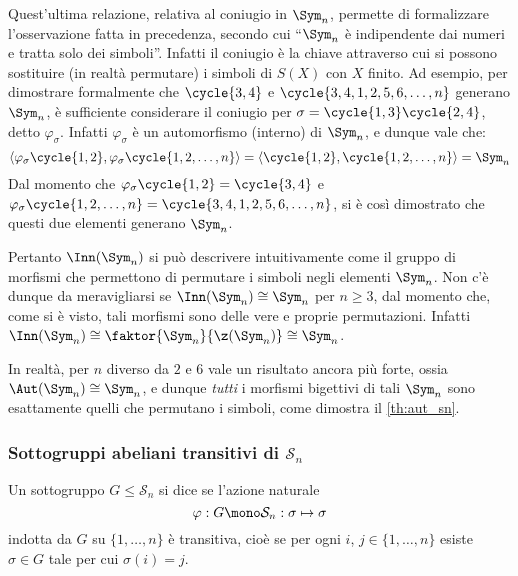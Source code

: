 \documentclass[11pt]{scrartcl}
\begin{document}
	\begin{remark}
		Quest'ultima relazione, relativa al coniugio in $\Sym_n$, permette di
		formalizzare l'osservazione fatta in precedenza, secondo cui
		``$\Sym_n$ è indipendente dai numeri e tratta solo dei simboli''. Infatti
		il coniugio è la chiave attraverso cui si possono sostituire (in realtà permutare)
		i simboli di $S(X)$ con $X$ finito. Ad esempio, per dimostrare formalmente che
		$\cycle{3, 4}$ e $\cycle{3, 4, 1, 2, 5, 6, \ldots, n}$ generano $\Sym_n$, è
		sufficiente considerare il coniugio per $\sigma = \cycle{1, 3} \cycle{2, 4}$, detto
		$\varphi_\sigma$. Infatti $\varphi_\sigma$ è un automorfismo (interno) di $\Sym_n$,
		e dunque vale che:
		\[ \langle \varphi_\sigma\cycle{1, 2}, \varphi_\sigma\cycle{1, 2, \ldots, n} \rangle = \langle \cycle{1, 2}, \cycle{1, 2, \ldots, n} \rangle = \Sym_n \]
		Dal momento che $\varphi_\sigma\cycle{1, 2} = \cycle{3, 4}$ e
		$\varphi_\sigma\cycle{1, 2, \ldots, n} = \cycle{3, 4, 1, 2, 5, 6, \ldots, n}$, si
		è così dimostrato che questi due elementi generano $\Sym_n$. \medskip
		
		
		Pertanto $\Inn(\Sym_n)$ si può descrivere intuitivamente come il gruppo di morfismi
		che permettono di permutare i simboli negli elementi $\Sym_n$. Non c'è dunque
		da meravigliarsi se $\Inn(\Sym_n) \cong \Sym_n$ per $n \geq 3$, dal momento
		che, come si è visto, tali morfismi sono delle vere e proprie permutazioni. 
		Infatti $\Inn(\Sym_n) \cong \faktor{\Sym_n}{\z(\Sym_n)} \cong \Sym_n$. \medskip
		
		
		In
		realtà, per $n$ diverso da $2$ e $6$ vale un risultato ancora più forte, ossia
		$\Aut(\Sym_n) \cong \Sym_n$, e dunque \textit{tutti} i morfismi bigettivi di tali $\Sym_n$
		sono esattamente quelli che permutano i simboli, come dimostra il \autoref{th:aut_sn}. 
	\end{remark}
	
	\subsubsection{Sottogruppi abeliani transitivi di \texorpdfstring{$\mathcal{S}_n$}{Sₙ}}
	
	\begin{definition}
		Un sottogruppo $G\leqslant \mathcal{S}_n$ si dice  se l'azione
		naturale
		\[
		\varphi: G \mono \mathcal{S}_n :\sigma \mapsto \sigma
		\]indotta da $G$ su $\{1, \ldots, n\}$ è transitiva, cioè se per ogni
		$i$, $j \in \{1, \ldots, n\}$ esiste $\sigma \in G$ tale per cui $\sigma(i) = j$.
	\end{definition}
	
\end{document}
